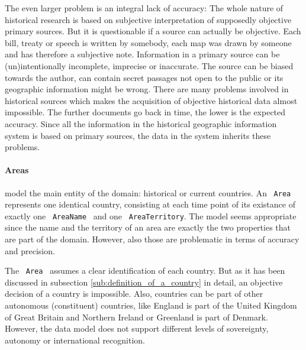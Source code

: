 The even larger problem is an integral lack of accuracy: The whole nature of historical research is based on subjective interpretation of supposedly objective primary sources. But it is questionable if a source can actually be objective. Each bill, treaty or speech is written by somebody, each map was drawn by someone and has therefore a subjective note. Information in a primary source can be (un)intentionally incomplete, imprecise or inaccurate. The source can be biased towards the author, can contain secret passages not open to the public or its geographic information might be wrong. There are many problems involved in historical sources which makes the acquisition of objective historical data almost impossible. The further documents go back in time, the lower is the expected accuracy. Since all the information in the historical geographic information system is based on primary sources, the data in the system inherits these problems.


\paragraph{Areas} %
\label{par:evaluation_areas}

model the main entity of the domain: historical or current countries. An ~\texttt{Area}~ represents one identical country, consisting at each time point of its existance of exactly one ~\texttt{AreaName}~ and one ~\texttt{AreaTerritory}. The model seems appropriate since the name and the territory of an area are exactly the two properties that are part of the domain. However, also those are problematic in terms of accuracy and precision.

The ~\texttt{Area}~ assumes a clear identification of each country. But as it has been discussed in subsection \ref{sub:definition_of_a_country} in detail, an objective decision of a country is impossible. Also, countries can be part of other autonomous (constituent) countries, like England is part of the United Kingdom of Great Britain and Northern Ireland or Greenland is part of Denmark. However, the data model does not support different levels of sovereignty, autonomy or international recognition.

